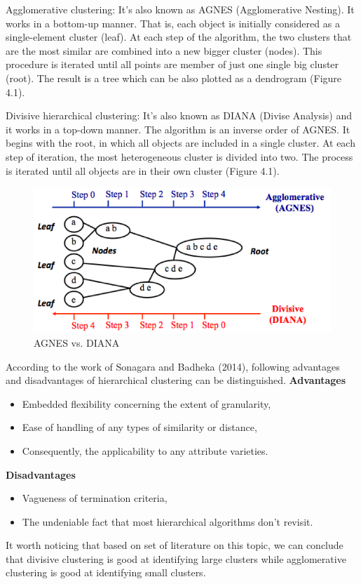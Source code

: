 \documentclass[a4paper,12pt,fleqn]{article}
\begin{document}
Agglomerative clustering: It's also known as AGNES (Agglomerative Nesting). It works in a bottom-up manner. That is, each object is initially considered as a single-element cluster (leaf). At each step of the algorithm, the two clusters that are the most similar are combined into a new bigger cluster (nodes). This procedure is iterated until all points are member of just one single big cluster (root). The result is a tree which can be also plotted as a dendrogram (Figure 4.1).

Divisive hierarchical clustering: It's also known as DIANA (Divise Analysis) and it works in a top-down manner. The algorithm is an inverse order of AGNES. It begins with the root, in which all objects are included in a single cluster. At each step of iteration, the most heterogeneous cluster is divided into two. The process is iterated until all objects are in their own cluster (Figure 4.1).

\begin{figure}[h]
	\centering
	\includegraphics[width=0.7\linewidth]{20.Agnes_Diana_Algorithms}
	\caption{AGNES vs. DIANA}
	\label{fig:20}
\end{figure}
According to the work of Sonagara and Badheka (2014), following advantages and disadvantages of hierarchical clustering can be distinguished. 
\textbf{Advantages}
\begin{itemize}
	\item Embedded flexibility concerning the extent of granularity,
	\item Ease of handling of any types of similarity or distance,
	\item Consequently, the applicability to any attribute varieties.
\end{itemize}
\textbf{Disadvantages}
\begin{itemize}
	\item Vagueness of termination criteria,
	\item The undeniable fact that most hierarchical algorithms don't revisit.	
\end{itemize}
It worth noticing that based on set of literature on this topic, we can conclude that divisive clustering is good at identifying large clusters while agglomerative clustering is good at identifying small clusters.
\end{document}
